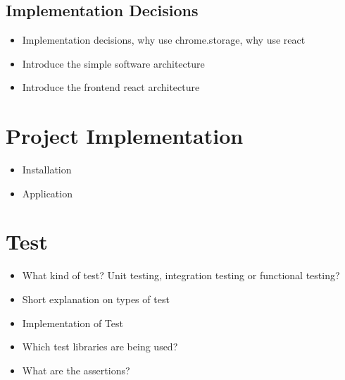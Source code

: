 \subsection{Implementation Decisions}

\begin{itemize}
  \item Implementation decisions, why use chrome.storage, why use react
  \item Introduce the simple software architecture
  \item Introduce the frontend react architecture
\end{itemize}

\section{Project Implementation}
\begin{itemize}
  \item Installation
  \item Application
\end{itemize}

\section{Test}
\begin{itemize}
  \item What kind of test? Unit testing, integration testing or functional testing?
  \item Short explanation on types of test
  \item Implementation of Test
  \item Which test libraries are being used?
  \item What are the assertions?
\end{itemize}
